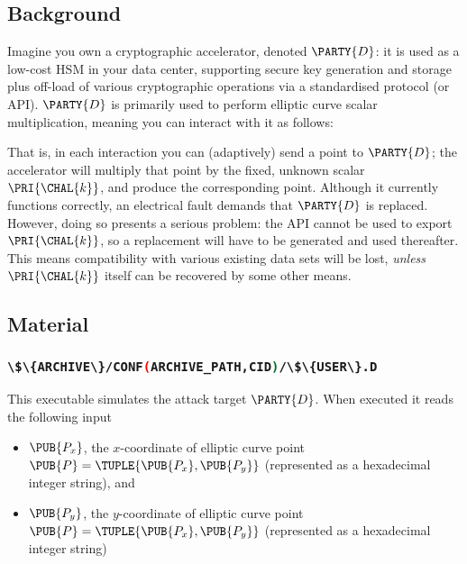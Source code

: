 \documentclass[crop={false},multi={true},tikz={true}]{standalone}
\begin{document}

\subsection{Background}

Imagine you own a cryptographic accelerator, denoted $\PARTY{D}$: it is used
as a low-cost HSM in your data center, supporting secure key generation and 
storage plus off-load of various cryptographic operations via a standardised 
protocol (or API).  $\PARTY{D}$ is primarily used to perform elliptic curve
scalar multiplication, meaning you can interact with it as follows:

\begin{center}

\end{center}

\noindent
That is, in each interaction you can (adaptively) send 
a point
to $\PARTY{D}$; the accelerator will
multiply that point by the fixed, unknown scalar $\PRI{\CHAL{k}}$,
and produce 
the corresponding point.
Although it currently functions correctly, an electrical fault demands that
$\PARTY{D}$ is replaced.  However, doing so presents a serious problem: the 
API cannot be used to export $\PRI{\CHAL{k}}$, so a replacement will have 
to be generated and used thereafter.  This means compatibility with various
existing data sets will be lost, {\em unless} $\PRI{\CHAL{k}}$ itself can 
be recovered by some other means.

\subsection{Material}

\subsubsection{\lstinline[language={bash}]|\$\{ARCHIVE\}/CONF(ARCHIVE_PATH,CID)/\$\{USER\}.D|}

This executable simulates the attack target $\PARTY{D}$.  When executed it 
reads the following input

\begin{itemize}
\item $\PUB{P_x}$,
      the $x$-coordinate of elliptic curve point $\PUB{P} = \TUPLE{ \PUB{P_x}, \PUB{P_y} }$
      (represented as a  hexadecimal integer string),      
      and
\item $\PUB{P_y}$,
      the $y$-coordinate of elliptic curve point $\PUB{P} = \TUPLE{ \PUB{P_x}, \PUB{P_y} }$
      (represented as a  hexadecimal integer string)
\end{itemize}
\end{document}
